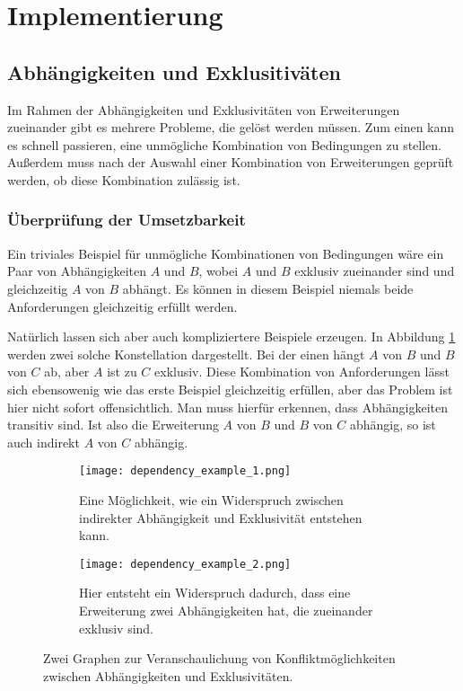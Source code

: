 \section{Implementierung}
\subsection{Abhängigkeiten und Exklusitiväten}
Im Rahmen der Abhängigkeiten und Exklusivitäten von Erweiterungen zueinander gibt es mehrere Probleme, die gelöst werden müssen. Zum einen kann es schnell passieren, eine unmögliche Kombination von Bedingungen zu stellen. Außerdem muss nach der Auswahl einer Kombination von Erweiterungen geprüft werden, ob diese Kombination zulässig ist.

\subsubsection{Überprüfung der Umsetzbarkeit}


Ein triviales Beispiel für unmögliche Kombinationen von Bedingungen wäre ein Paar von Abhängigkeiten $A$ und $B$, wobei $A$ und $B$ exklusiv zueinander sind und gleichzeitig $A$ von $B$ abhängt. Es können in diesem Beispiel niemals beide Anforderungen gleichzeitig erfüllt werden.

Natürlich lassen sich aber auch kompliziertere Beispiele erzeugen. In Abbildung \ref{fig:impl:dependency_conflict_examples} werden zwei solche Konstellation dargestellt. Bei der einen hängt $A$ von $B$ und $B$ von $C$ ab, aber $A$ ist zu $C$ exklusiv. Diese Kombination von Anforderungen lässt sich ebensowenig wie das erste Beispiel gleichzeitig erfüllen, aber das Problem ist hier nicht sofort offensichtlich. Man muss hierfür erkennen, dass Abhängigkeiten transitiv sind. Ist also die Erweiterung $A$ von $B$ und $B$ von $C$ abhängig, so ist auch indirekt $A$ von $C$ abhängig.

  \begin{figure}
		\centering
		\begin{subfigure}[a]{0.4\linewidth}
			\texttt{[image: dependency\_example\_1.png]}
      		\caption{Eine Möglichkeit, wie ein Widerspruch zwischen indirekter Abhängigkeit und Exklusivität entstehen kann.}
		\end{subfigure}
		\begin{subfigure}[a]{0.4\linewidth}
			\texttt{[image: dependency\_example\_2.png]}
      		\caption{Hier entsteht ein Widerspruch dadurch, dass eine Erweiterung zwei Abhängigkeiten hat, die zueinander exklusiv sind.}
		\end{subfigure}
		\caption{Zwei Graphen zur Veranschaulichung von Konfliktmöglichkeiten zwischen Abhängigkeiten und Exklusivitäten.}
		\label{fig:impl:dependency_conflict_examples}
  \end{figure}


